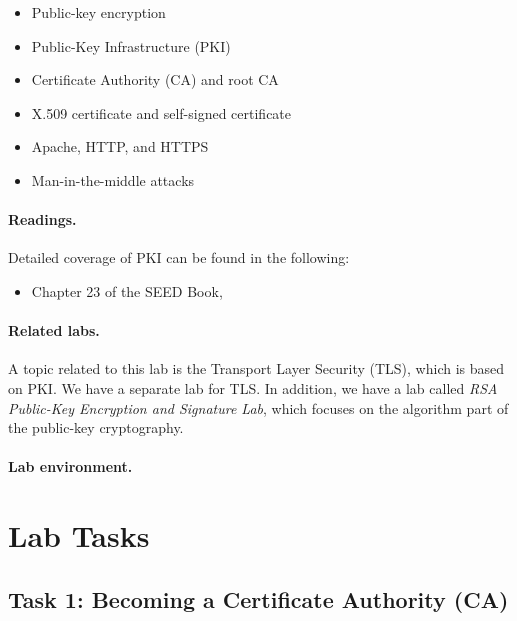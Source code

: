 \begin{itemize}[noitemsep]
\item Public-key encryption
\item Public-Key Infrastructure (PKI)
\item Certificate Authority (CA) and root CA 
\item X.509 certificate and self-signed certificate
\item Apache, HTTP, and HTTPS
\item Man-in-the-middle attacks
\end{itemize}



\paragraph{Readings.}
Detailed coverage of PKI can be found in the following:

\begin{itemize}
\item Chapter 23 of the SEED Book, \seedbook
\end{itemize}


\paragraph{Related labs.}
A topic related to this lab is the Transport Layer Security (TLS), which is based on  
PKI. We have a separate lab for TLS.
In addition, we have a lab called \textit{RSA Public-Key Encryption and Signature Lab}, 
which focuses on the algorithm part of the public-key cryptography.


\paragraph{Lab environment.} \seedenvironment 



\section{Lab Tasks}


\subsection{Task 1: Becoming a Certificate Authority (CA)}

